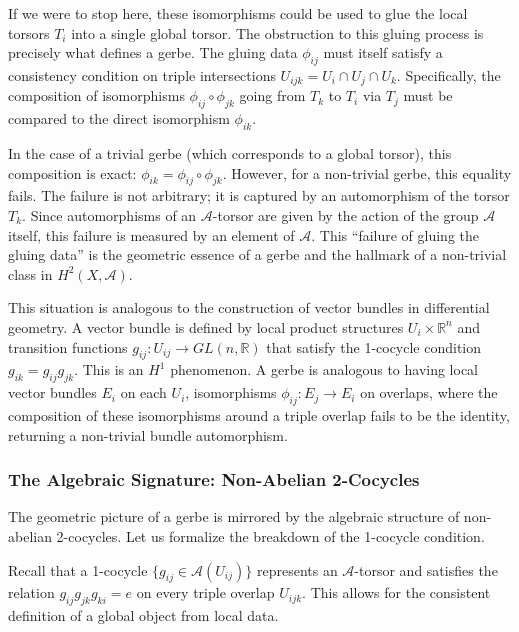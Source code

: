 \documentclass[
]{article}
\begin{document}
If we were to stop here, these isomorphisms could be used to glue the
local torsors \(T_i\) into a single global torsor. The obstruction to
this gluing process is precisely what defines a gerbe. The gluing data
\(\phi_{ij}\) must itself satisfy a consistency condition on triple
intersections \(U_{ijk} = U_i \cap U_j \cap U_k\). Specifically, the
composition of isomorphisms \(\phi_{ij} \circ \phi_{jk}\) going from
\(T_k\) to \(T_i\) via \(T_j\) must be compared to the direct
isomorphism \(\phi_{ik}\).

In the case of a trivial gerbe (which corresponds to a global torsor),
this composition is exact: \(\phi_{ik} = \phi_{ij} \circ \phi_{jk}\).
However, for a non-trivial gerbe, this equality fails. The failure is
not arbitrary; it is captured by an automorphism of the torsor \(T_k\).
Since automorphisms of an \(\mathcal{A}\)-torsor are given by the action
of the group \(\mathcal{A}\) itself, this failure is measured by an
element of \(\mathcal{A}\). This ``failure of gluing the gluing data''
is the geometric essence of a gerbe and the hallmark of a non-trivial
class in \(H^2(X, \mathcal{A})\).

This situation is analogous to the construction of vector bundles in
differential geometry. A vector bundle is defined by local product
structures \(U_i \times \mathbb{R}^n\) and transition functions
\(g_{ij}: U_{ij} \to GL(n, \mathbb{R})\) that satisfy the 1-cocycle
condition \(g_{ik} = g_{ij} g_{jk}\). This is an \(H^1\) phenomenon. A
gerbe is analogous to having local vector bundles \(E_i\) on each
\(U_i\), isomorphisms \(\phi_{ij}: E_j \to E_i\) on overlaps, where the
composition of these isomorphisms around a triple overlap fails to be
the identity, returning a non-trivial bundle automorphism.

\subsubsection{The Algebraic Signature: Non-Abelian
2-Cocycles}\label{the-algebraic-signature-non-abelian-2-cocycles}

The geometric picture of a gerbe is mirrored by the algebraic structure
of non-abelian 2-cocycles. Let us formalize the breakdown of the
1-cocycle condition.

Recall that a 1-cocycle \(\{g_{ij} \in \mathcal{A}(U_{ij})\}\)
represents an \(\mathcal{A}\)-torsor and satisfies the relation
\(g_{ij} g_{jk} g_{ki} = e\) on every triple overlap \(U_{ijk}\). This
allows for the consistent definition of a global object from local data.
\end{document}
